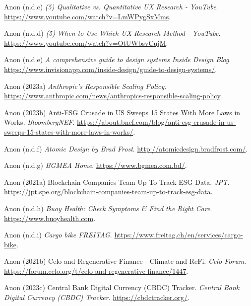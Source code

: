 \documentclass[
  letterpaper,
  DIV=11,
  numbers=noendperiod]{scrartcl}
\newlength{\cslhangindent}
\newenvironment{CSLReferences}[2] %
 {\begin{list}{}{%
  \setlength{\itemindent}{0pt}
  \setlength{\leftmargin}{0pt}
  \setlength{\parsep}{0pt}
  \ifodd #1
   \setlength{\leftmargin}{\cslhangindent}
   \setlength{\itemindent}{-1\cslhangindent}
  \fi
  \setlength{\itemsep}{#2\baselineskip}}}
 {\end{list}}
\begin{document}
\begin{CSLReferences}{0}{1}
Anon (n.d.c) \emph{(5) {Qualitative} vs. {Quantitative UX Research} -
{YouTube}}. \url{https://www.youtube.com/watch?v=LmWPygSxMms}.

Anon (n.d.d) \emph{(5) {When} to {Use Which UX Research Method} -
{YouTube}}. \url{https://www.youtube.com/watch?v=OtUWbsvCujM}.

Anon (n.d.e) \emph{A comprehensive guide to design systems {\textbar}
{Inside Design Blog}}.
\url{https://www.invisionapp.com/inside-design/guide-to-design-systems/}.

Anon (2023a) \emph{Anthropic's {Responsible Scaling Policy}}.
\url{https://www.anthropic.com/news/anthropics-responsible-scaling-policy}.

Anon (2023b) Anti-{ESG Crusade} in {US Sweeps} 15 {States With More
Laws} in {Works}. \emph{BloombergNEF}.
\url{https://about.bnef.com/blog/anti-esg-crusade-in-us-sweeps-15-states-with-more-laws-in-works/}.

Anon (n.d.f) \emph{Atomic {Design} by {Brad Frost}}.
\url{http://atomicdesign.bradfrost.com/}.

Anon (n.d.g) \emph{{BGMEA} {\textbar} {Home}}.
\url{https://www.bgmea.com.bd/}.

Anon (2021a) Blockchain {Companies Team Up To Track ESG Data}.
\emph{JPT}.
\url{https://jpt.spe.org/blockchain-companies-team-up-to-track-esg-data}.

Anon (n.d.h) \emph{Buoy {Health}: {Check Symptoms} \& {Find} the {Right
Care}}. \url{https://www.buoyhealth.com}.

Anon (n.d.i) \emph{Cargo bike {\textbar} {FREITAG}}.
\url{https://www.freitag.ch/en/services/cargo-bike}.

Anon (2021b) Celo and {Regenerative Finance} - {Climate} and {ReFi}.
\emph{Celo Forum}.
\url{https://forum.celo.org/t/celo-and-regenerative-finance/1447}.

Anon (2023c) Central {Bank Digital Currency} ({CBDC}) {Tracker}.
\emph{Central Bank Digital Currency (CBDC) Tracker}.
\url{https://cbdctracker.org/}.


\end{CSLReferences}
\end{document}
